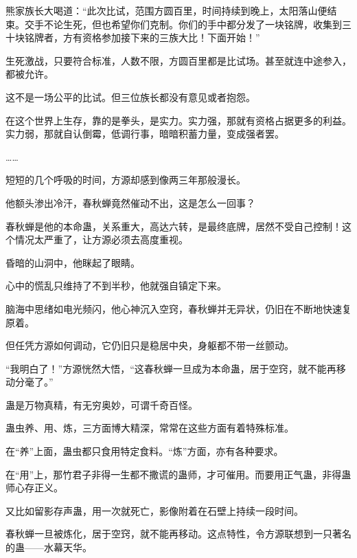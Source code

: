 \begin{this_body}
熊家族长大喝道：“此次比试，范围方圆百里，时间持续到晚上，太阳落山便结束。交手不论生死，但也希望你们克制。你们的手中都分发了一块铭牌，收集到三十块铭牌者，方有资格参加接下来的三族大比！下面开始！”

生死激战，只要符合标准，人数不限，方圆百里都是比试场。甚至就连中途参入，都被允许。

这不是一场公平的比试。但三位族长都没有意见或者抱怨。

在这个世界上生存，靠的是拳头，是实力。实力强，那就有资格占据更多的利益。实力弱，那就自认倒霉，低调行事，暗暗积蓄力量，变成强者罢。

……

短短的几个呼吸的时间，方源却感到像两三年那般漫长。

他额头渗出冷汗，春秋蝉竟然催动不出，这是怎么一回事？

春秋蝉是他的本命蛊，关系重大，高达六转，是最终底牌，居然不受自己控制！这个情况太严重了，让方源必须去高度重视。

昏暗的山洞中，他眯起了眼睛。

心中的慌乱只维持了不到半秒，他就强自镇定下来。

脑海中思绪如电光频闪，他心神沉入空窍，春秋蝉并无异状，仍旧在不断地快速复原着。

但任凭方源如何调动，它仍旧只是稳居中央，身躯都不带一丝颤动。

“我明白了！”方源恍然大悟，“这春秋蝉一旦成为本命蛊，居于空窍，就不能再移动分毫了。”

蛊是万物真精，有无穷奥妙，可谓千奇百怪。

蛊虫养、用、炼，三方面博大精深，常常在这些方面有着特殊标准。

在“养”上面，蛊虫都只食用特定食料。“炼”方面，亦有各种要求。

在“用”上，那竹君子非得一生都不撒谎的蛊师，才可催用。而要用正气蛊，非得蛊师心存正义。

又比如留影存声蛊，用一次就死亡，影像附着在石壁上持续一段时间。

春秋蝉一旦被炼化，居于空窍，就不能再移动。这点特性，令方源联想到一只著名的蛊——水幕天华。

\end{this_body}

